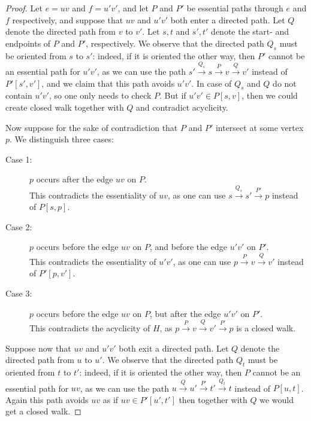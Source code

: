 \documentclass[a4paper,11pt]{article}
\theoremstyle{plain}
\newtheorem{identification rule}{Identification Rule}
\theoremstyle{definition}
\theoremstyle{remark}
\begin{document}
\begin{proof}
Let $e=uv$ and $f=u'v'$, and let $P$ and $P'$ be essential paths through $e$ and $f$ respectively, and suppose that $uv$ and $u'v'$ both enter a directed path. Let $Q$ denote the directed path from $v$ to $v'$. Let $s,t$ and $s',t'$ denote the start- and endpoints of $P$ and $P'$, respectively. We observe that the directed path $Q_s$ must be oriented from $s$ to $s'$: indeed, if it is oriented the other way, then $P'$ cannot be an essential path for $u'v'$, as we can use the path $s'\xrightarrow{Q_s} s\xrightarrow{P} v \xrightarrow{Q} v'$ instead of $P'[s',v']$, and we claim that this path avoids $u'v'$. In case of $Q_s$ and $Q$ do not contain $u'v'$, so one only needs to check $P$. But if $u'v'\in P[s,v]$, then we could create closed walk together with $Q$ and contradict acyclicity.

Now suppose for the sake of contradiction that $P$ and $P'$ intersect at some vertex $p$. We distinguish three cases:
\begin{description}
\item[Case 1:] $p$ occurs after the edge $uv$ on $P$.\\
This contradicts the essentiality of $uv$, as one can use $s\xrightarrow{Q_s} s' \xrightarrow{P'} p$ instead of $P[s,p]$.
\item[Case 2:] $p$ occurs before the edge $uv$ on $P$, and before the edge $u'v'$ on $P'$.\\
This contradicts the essentiality of $u'v'$, as one can use $p\xrightarrow{P} v \xrightarrow{Q} v'$ instead of $P'[p,v']$.
\item[Case 3:] $p$ occurs before the edge $uv$ on $P$, but after the edge $u'v'$ on $P'$.\\
This contradicts the acyclicity of $H$, as $p \xrightarrow{P} v \xrightarrow{Q} v' \xrightarrow{P'} p$ is a closed walk.
\end{description}


Suppose now that $uv$ and $u'v'$ both exit a directed path. Let $Q$ denote the directed path from $u$ to $u'$. We observe that the directed path $Q_t$ must be oriented from $t$ to $t'$: indeed, if it is oriented the other way, then $P$ cannot be an essential path for $uv$, as we can use the path $u \xrightarrow{Q} u'\xrightarrow{P'} t' \xrightarrow{Q_t} t$ instead of $P[u,t]$. Again this path avoids $uv$ as if $uv\in P'[u',t']$ then together with $Q$ we would get a closed walk. 


\end{proof}
\end{document}
